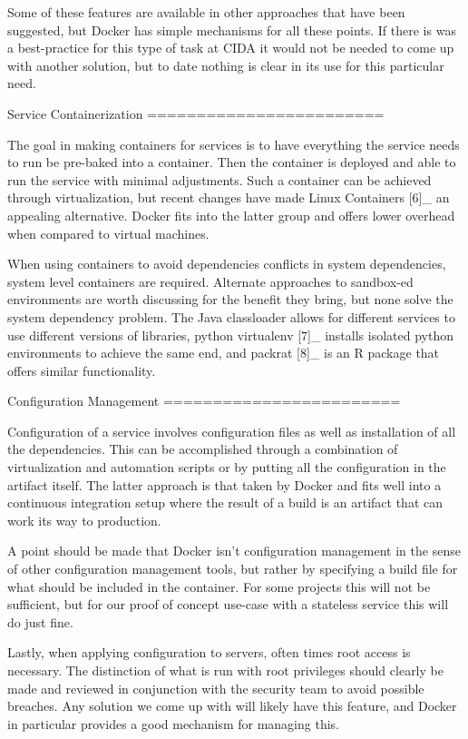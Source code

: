Some of these features are available in other approaches that have been
suggested, but Docker has simple mechanisms for all these points.  If 
there is was a best-practice for this type of task at CIDA it would not
be needed to come up with another solution, but to date nothing is clear
in its use for this particular need.

Service Containerization
========================

The goal in making containers for services is to have everything the service
needs to run be pre-baked into a container.  Then the container is deployed
and able to run the service with minimal adjustments.  Such a container can
be achieved through virtualization, but recent changes have made Linux
Containers [6]_ an appealing alternative.  Docker fits into the latter group
and offers lower overhead when compared to virtual machines.

When using containers to avoid dependencies conflicts in system dependencies,
system level containers are required.  Alternate approaches to sandbox-ed
environments are worth discussing for the benefit they bring, but none solve
the system dependency problem.  The Java classloader allows for different
services to use different versions of libraries, python virtualenv [7]_
installs isolated python environments to achieve the same end, and packrat [8]_
is an R package that offers similar functionality.

Configuration Management
========================

Configuration of a service involves configuration files as well as
installation of all the dependencies.  This can be accomplished through a
combination of virtualization and automation scripts or by putting all the
configuration in the artifact itself.  The latter approach is that taken by
Docker and fits well into a continuous integration setup where the result of
a build is an artifact that can work its way to production.

A point should be made that Docker isn't configuration management in the sense
of other configuration management tools, but rather by specifying a build file
for what should be included in the container.  For some projects this will not
be sufficient, but for our proof of concept use-case with a stateless service
this will do just fine.

Lastly, when applying configuration to servers, often times root access is
necessary.  The distinction of what is run with root privileges should clearly
be made and reviewed in conjunction with the security team to avoid possible
breaches.  Any solution we come up with will likely have this feature, and
Docker in particular provides a good mechanism for managing this.

